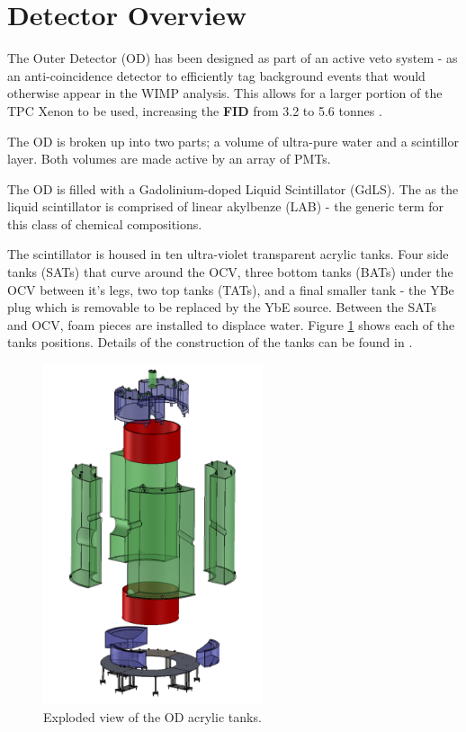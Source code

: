 \section{Detector Overview} \label{OD_detector_overview}

\par
The Outer Detector (OD) has been designed as part of an active veto system - as an anti-coincidence detector to efficiently tag background events that would otherwise appear in the WIMP analysis.
This allows for a larger portion of the TPC Xenon to be used, increasing the \textbf{FID} from 3.2 to 5.6 tonnes \cite{LZ_TechnicalDesignReview_ref}.

\par
The OD is broken up into two parts; a volume of ultra-pure water and a scintillor layer.
Both volumes are made active by an array of PMTs.


\par
The OD is filled with a Gadolinium-doped Liquid Scintillator (GdLS).
The as the liquid scintillator is comprised of linear akylbenze (LAB) - the generic term for this class of chemical compositions.

\par
The scintillator is housed in ten ultra-violet transparent acrylic tanks.
Four side tanks (SATs) that curve around the OCV, three bottom tanks (BATs) under the OCV between it's legs, two top tanks (TATs), and a final smaller tank - the YBe plug which is removable to be replaced by the YbE source.
Between the SATs and OCV, foam pieces are installed to displace water.
Figure \ref{fig:LZ_OD_Tanks} shows each of the tanks positions.
Details of the construction of the tanks can be found in \cite{scotthaselschwardt_thesis_ref}.
\begin{figure}
    \centering
    \includegraphics[height=10cm]{Figures/LZ/OD_Tanks_CAD.png}
    \caption{Exploded view of the OD acrylic tanks.}
    \label{fig:LZ_OD_Tanks}
\end{figure}

